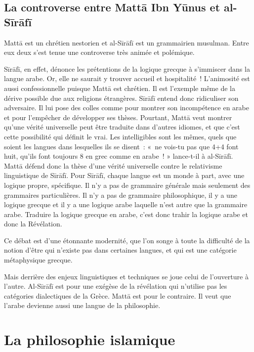 \subsection{La controverse entre Mattā Ibn Yūnus et
al-Sīrāfī
}
Mattā est un chrétien nestorien et al-Sīrāfī est un grammairien
musulman. Entre eux deux s'est tenue une controverse très animée et
polémique.

Sīrāfī, en effet, dénonce les prétentions de la logique grecque à
s'immiscer dans la langue arabe. Or, elle ne saurait y trouver accueil
et hospitalité~! L'animosité est aussi confessionnelle puisque Mattā est
chrétien. Il est l'exemple même de la dérive possible due aux religions
étrangères. Sīrāfī entend donc ridiculiser son adversaire. Il lui pose
des colles comme pour montrer son incompétence en arabe et pour
l'empêcher de développer ses thèses. Pourtant, Mattā veut montrer qu'une
vérité universelle peut être traduite dans d'autres idiomes, et que
c'est cette possibilité qui définit le vrai. Les intelligibles sont les
mêmes, quels que soient les langues dans lesquelles ils se disent~: «~ne
vois-tu pas que 4+4 font huit, qu'ils font toujours 8 en grec comme en
arabe~! » lance-t-il à al-Sīrāfī. Mattā défend donc la thèse d'une
vérité universelle contre le relativisme linguistique de Sīrāfī. Pour
Sīrāfī, chaque langue est un monde à part, avec une logique propre,
spécifique. Il n'y a pas de grammaire générale mais seulement des
grammaires particulières. Il n'y a pas de grammaire philosophique, il y
a une logique grecque et il y a une logique arabe laquelle n'est autre
que la grammaire arabe. Traduire la logique grecque en arabe, c'est donc
trahir la logique arabe et donc la Révélation.

Ce débat est d'une étonnante modernité, que l'on songe à toute la
difficulté de la notion d'être qui n'existe pas dans certaines langues,
et qui est une catégorie métaphysique grecque.

Mais derrière des enjeux linguistiques et techniques se joue celui de
l'ouverture à l'autre. Al-Sīrāfī est pour une exégèse de la révélation
qui n'utilise pas les catégories dialectiques de la Grèce. Mattā est
pour le contraire. Il veut que l'arabe devienne aussi une langue de la
philosophie.


\section{La philosophie islamique
}


